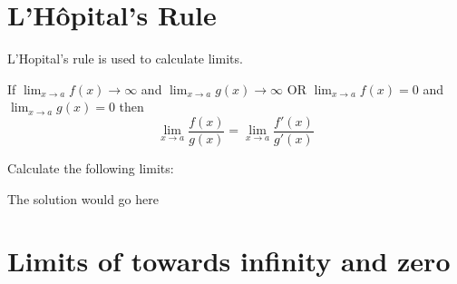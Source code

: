 \documentclass{oxmathproblems}
\begin{document}
\section*{L'H\^opital's Rule}
L'Hopital's rule is used to calculate limits.

If $\displaystyle{\lim_{x\to a} f(x)\to\infty}$ and $\displaystyle{\lim_{x\to a} g(x)\to\infty}$ OR $\displaystyle{\lim_{x\to a} f(x)=0}$ and $\displaystyle{\lim_{x\to a} g(x)=0}$   then
$$\lim_{x\to a} \frac{f(x)}{g(x)} = \lim_{x\to a} \frac{f'(x)}{g'(x)}$$ 

\begin{questions}

\question
Calculate the following limits:

\begin{solution}
  The solution would go here
\end{solution}

\end{questions}
\newpage

\section*{Limits of towards infinity and zero}
\end{document}

